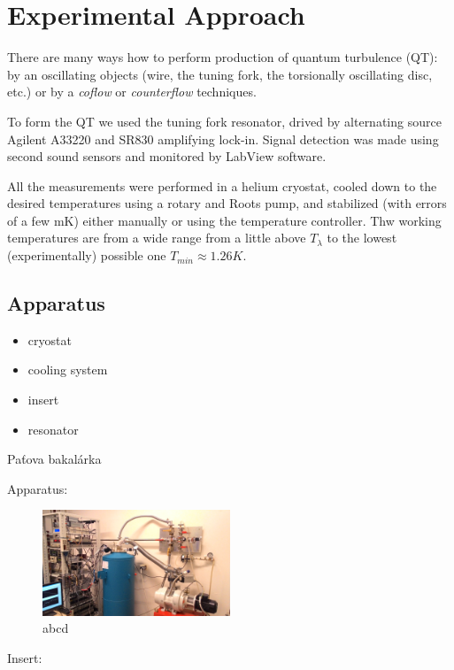 \chapter{Experimental Approach}

There are many ways how to perform production of quantum turbulence (QT): by an oscillating objects (wire, the tuning fork, the torsionally oscillating disc, etc.) or by a \textit{coflow} or \textit{counterflow} techniques.

To form the QT we used the tuning fork resonator, drived by alternating source Agilent A33220 and SR830 amplifying lock-in. Signal detection was made using second sound sensors and monitored by LabView software.

All the measurements were performed in a helium cryostat, cooled down to the desired temperatures using a rotary and Roots pump, and stabilized (with errors of a few mK) either manually or using the temperature controller. Thw working temperatures are from a wide range from a little above $T_{\lambda}$ to the lowest (experimentally) possible one $T_{min} \approx 1.26\unit{K}$.

\section{Apparatus}
\begin{itemize}
	\item cryostat
	\item cooling system
	\item insert
	\item resonator
\end{itemize}

Paťova bakalárka

Apparatus:

\begin{figure}[h]
	\centering
	\includegraphics[width=0.5\textwidth]{graphics/exp/apparatus}
	\caption{abcd}
\end{figure}

Insert:

